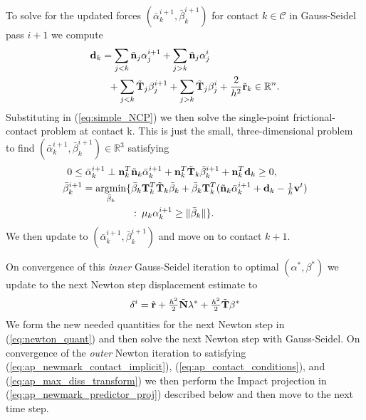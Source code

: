 To solve for the updated forces $(\bar{\alpha}_k^{i+1}, \bar{\beta}_k^{i+1})$ for contact $k \in \mathcal{C}$ in Gauss-Seidel pass $i+1$ we compute
\begin{align}
\begin{split}
\mathbf {d}_k &=  \sum_{j<k} \tilde{\mathbf {n}}_j \alpha_j^{i+1} +  \sum_{j>k} \tilde{\mathbf {n}}_j \alpha_j^i \\
& \> \> \> + \sum_{j<k}  \tilde{\mathbf {T}}_j \beta_j^{i+1} + \sum_{j>k} \tilde{\mathbf {T}}_j \beta_j^i+ \frac{2}{h^2} \tilde{\mathbf {r}}_k \in \mathbb{R}^n.
\end{split}
\end{align}
Substituting in (\ref{eq:simple_NCP}) we then solve the single-point frictional-contact problem at contact k. This is just the small, three-dimensional problem to find $(\bar{\alpha}_k^{i+1}, \bar{\beta}_k^{i+1}) \in \mathbb{R}^3$ satisfying
\begin{align}
\begin{split}
0 \leq \bar{\alpha}_k^{i+1} \perp  \mathbf {n}_k^T & \tilde{\mathbf {n}}_k \bar{\alpha}_k^{i+1}  + \mathbf {n}_k^T \tilde{\mathbf {T}}_k \bar{\beta}_k^{i+1} + \mathbf {n}_k^T \mathbf {d}_k \geq 0,\\
\bar{\beta}_k^{i+1} = \mathop{\rm argmin}_{\bar{\beta}_k} \{ &\bar{\beta}_k \mathbf {T}_k^T  \tilde{\mathbf {T}}_k \bar{\beta}_k + \bar{\beta}_k \mathbf {T}_k^T(\tilde{\mathbf {n}}_k \bar{\alpha}_k^{i+1} +   \mathbf {d}_k- \tfrac{1}{h} \mathbf {v}^t) \\
&  : \> \mu_k \alpha^{i+1}_k \geq \|\bar{\beta}_k\|\}.
\end{split}
\end{align}
We then update to $(\bar{\alpha}_k^{i+1}, \bar{\beta}_k^{i+1})$ and move on to contact $k+1$.

On convergence of this \emph{inner} Gauss-Seidel iteration to optimal $(\alpha^*,\beta^*)$ we update to the next Newton step displacement estimate to
\begin{align}
\delta^i = \tilde{\mathbf {r}} + \tfrac{h^2}{2} \tilde{\mathbf {N}} \lambda^* + \tfrac{h^2}{2}\tilde{\mathbf {T}} \beta^*
\end{align} 
We form the new needed quantities for the next Newton step in (\ref{eq:newton_quant}) and then solve the next Newton step with Gauss-Seidel. On convergence of the \emph{outer} Newton iteration to satisfying (\ref{eq:ap_newmark_contact_implicit}), (\ref{eq:ap_contact_conditions}), and (\ref{eq:ap_max_diss_transform}) we then perform the Impact projection in (\ref{eq:ap_newmark_predictor_proj}) described below and then move to the next time step. 

